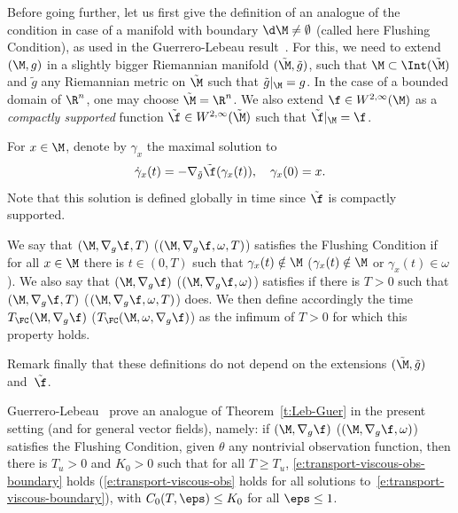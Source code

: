 Before going further, let us first give the definition of an analogue of the condition \pGCC in case of a manifold with boundary $\d\M \neq \emptyset$ (called here Flushing Condition), as used in the Guerrero-Lebeau result~\cite{GL:07}. For this, we need to extend $(\M,g)$ in a slightly bigger Riemannian manifold $(\tilde{\M}, \tilde{g})$, \ie such that $\M\subset \Int(\tilde{\M})$ and $\tilde{g}$ any Riemannian metric on $\tilde{\M}$ such that $\tilde{g}|_{\M}=g$. In the case of a bounded domain of $\R^n$, one may choose $\tilde{\M} = \R^n$. We also extend $\f \in W^{2,\infty}(\M)$ as a {\em compactly supported } function $\tilde{\f}\in W^{2,\infty}(\tilde{\M})$ such that $\tilde{\f}|_{\M} = \f$.
\begin{definition}
\label{d:def-GCC_bdry}
For $x\in \M$, denote by $\gamma_x$ the maximal solution to
\[
\dot{\gamma}_x(t) = -\nabla_{\tilde{g}}\tilde{\f}(\gamma_x(t)), \quad \gamma_x(0)=x. 
\]
Note that this solution is defined globally in time since $\tilde{\f}$ is compactly supported.

We say that $(\M,\nabla_g \f,T)$ (\resp $(\M,\nabla_g \f,\omega,T)$) satisfies the Flushing Condition \pFC if for all $x\in \M$ there is $t\in (0,T)$ such that $\gamma_x(t)\notin \M$ (\resp $\gamma_x(t)\notin \M$ or $\gamma_x(t)\in \omega$). We also say that $(\M,\nabla_g \f)$ (\resp $(\M,\nabla_g \f,\omega)$) satisfies \pFC if there is $T>0$ such that $(\M,\nabla_g \f,T)$ (\resp $(\M,\nabla_g \f,\omega,T)$) does. We then define accordingly the time $T_{\FC}(\M,\nabla_g \f)$ (\resp $T_{\FC}(\M,\omega,\nabla_g \f)$) as the infimum of $T>0$ for which this property holds.

Remark finally that these definitions do not depend on the extensions $(\tilde{\M}, \tilde{g})$ and~$\tilde{\f}$.
\end{definition}

Guerrero-Lebeau~\cite{GL:07} prove an analogue of Theorem~\ref{t:Leb-Guer} in the present setting (and for general vector fields), namely: if $(\M,\nabla_g \f)$ (\resp $(\M,\nabla_g \f,\omega)$) satisfies the Flushing Condition, given $\theta$ any nontrivial observation function, then there is $T_{u}>0$ and $K_0>0$ such that for all $T\geq T_{u}$, \eqref{e:transport-viscous-obs-boundary} holds (\resp \eqref{e:transport-viscous-obs} holds for all solutions to~\eqref{e:transport-viscous-boundary}), with $C_0(T,\eps)\leq K_0$ for all $\eps \leq 1$.

